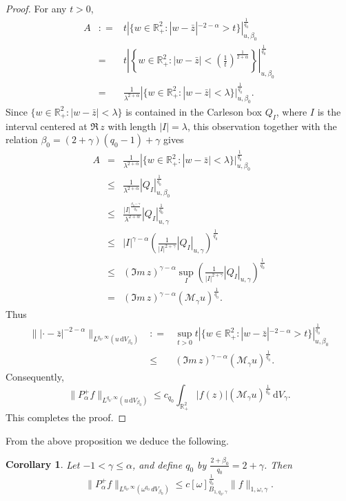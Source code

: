 \documentclass[a4paper,11pt,intlimits,oneside]{amsart}
\newtheorem{corollary}[theorem]{Corollary}
\theoremstyle{definition}
\numberwithin{equation}{section}
\theoremstyle{definition}
\newcommand{\Be}{\begin{equation}}
\newcommand{\Ee}{\end{equation}}
\begin{document}
\begin{proof}
For any $t>0$,
\begin{eqnarray*}
A & : = & t|\{w\in\mathbb{R}^2_+ : |w-\bar{z}|^{-2-\alpha} > t\}|^{\frac{1}{q_0}}_{u,\beta_0}\\
&=& t\left|\left\{w\in\mathbb{R}^2_+ : |w-\bar{z}| <\left(\frac{1}{t}\right)^{\frac{1}{2+\alpha}}\right\}\right|^{\frac{1}{q_0}}_{u,\beta_0}\\
&=&\frac{1}{\lambda^{2+\alpha}}|\{w\in\mathbb{R}^2_+ : |w-\bar{z}| <\lambda \}|^{\frac{1}{q_0}}_{u,\beta_0}.
\end{eqnarray*}
Since $\{w\in\mathbb{R}^2_+ : |w-\bar{z}| <\lambda \}$ is contained in the Carleson box $Q_I$, where $I$ is the interval centered at $\Re\, z$ with length $|I|=\lambda$, this observation together with the relation $\beta_0=(2+\gamma)(q_0-1)+\gamma$ gives
\begin{eqnarray*}
A & = & \frac{1}{\lambda^{2+\alpha}}|\{w\in\mathbb{R}^2_+ : |w-\bar{z}| <\lambda \}|^{\frac{1}{q_0}}_{u,\beta_0}\\
 & \le & \frac{1}{\lambda^{2+\alpha}}|Q_I|^{\frac{1}{q_0}}_{u,\beta_0}\\ &\le& \frac{|I|^{\frac{\beta_0-\gamma}{q_0}}}{\lambda^{2+\alpha}}|Q_I|^{\frac{1}{q_0}}_{u,\gamma}\\ &\le&  |I|^{\gamma-\alpha}\left( \frac{1}{|I|^{2+\gamma}}|Q_I|_{u,\gamma}\right)^{\frac{1}{q_0}}\\ &\le&  \left(\Im m\, z\right)^{\gamma-\alpha}\sup_I\left( \frac{1}{|I|^{2+\gamma}}|Q_I|_{u,\gamma}\right)^{\frac{1}{q_0}}\\ &=& \left(\Im m\, z\right)^{\gamma-\alpha}\left( \mathcal{M}_{\gamma}u\right)^{\frac{1}{q_0}}.
\end{eqnarray*}
Thus
\begin{eqnarray*}
\||\cdot - \bar{z}|^{-2-\alpha}\|_{L^{q_0,\infty}(u\,\mathrm{d}V_{\beta_0})} & : = &\sup_{t>0} t|\{w\in\mathbb{R}^2_+ : |w-\bar{z}|^{-2-\alpha} > t\}|^{\frac{1}{q_0}}_{u,\beta_0}\\ &\le&  \left(\Im m\, z\right)^{\gamma-\alpha}\left( \mathcal{M}_{\gamma}u\right)^{\frac{1}{q_0}}.
\end{eqnarray*}
Consequently,
$$\| P_{\alpha}^+f\|_{L^{q_0,\infty}(u\,\mathrm{d}V_{\beta_0})}\le c_{q_0} \int_{\mathbb{R}^2_+}|f(z)|(\mathcal{M}_{\gamma}u)^{\frac{1}{q_0}}\,\mathrm{d}V_{\gamma}.$$
This completes the proof.
\end{proof}
From the above proposition we deduce the following.
\begin{corollary}\label{cor:weak initialestim}
Let $-1<\gamma\leq \alpha$, and define $q_0$ by $\frac{2+\beta_0}{q_0}=2+\gamma$. Then
\Be\label{eq:weightmax}\| P_{\alpha}^+f\|_{L^{q_0,\infty}(\omega^{q_0}\,{d}V_{\beta_0})}\le c[\omega]_{B_{1,q_0,\gamma}}^{\frac{1}{q_0}}\|f\|_{1,\omega,\gamma}.\Ee
\end{corollary}
\end{document}
